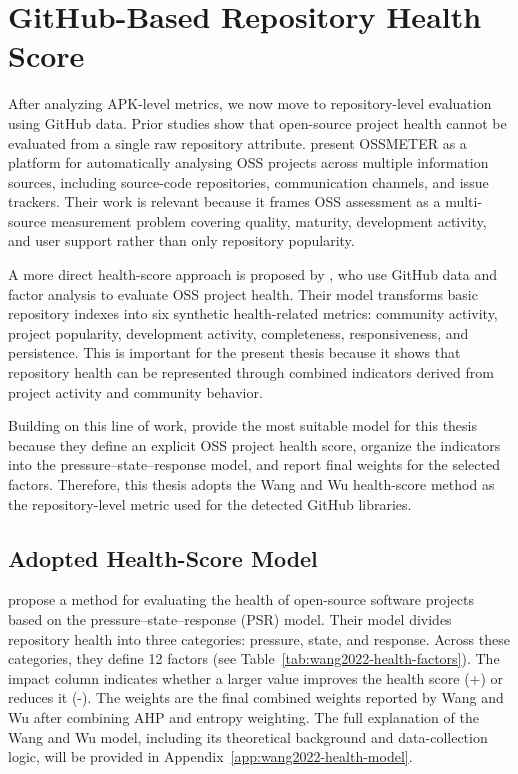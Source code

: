 \documentclass[12pt,a4paper]{report}
\begin{document}
\section{GitHub-Based Repository Health Score}

After analyzing APK-level metrics, we now move to repository-level evaluation using GitHub data. Prior studies show that open-source project health cannot be evaluated from a single raw repository attribute. \textcite{diruscioOSSMETERSoftwareMeasurement2015} present OSSMETER as a platform for automatically analysing OSS projects across multiple information sources, including source-code repositories, communication channels, and issue trackers. Their work is relevant because it frames OSS assessment as a multi-source measurement problem covering quality, maturity, development activity, and user support rather than only repository popularity.

A more direct health-score approach is proposed by \parencite{jiangMetricsEvaluateHealth2019}, who use GitHub data and factor analysis to evaluate OSS project health. Their model transforms basic repository indexes into six synthetic health-related metrics: community activity, project popularity, development activity, completeness, responsiveness, and persistence. This is important for the present thesis because it shows that repository health can be represented through combined indicators derived from project activity and community behavior.

Building on this line of work, \parencite{wangMethodEvaluateHealth2022} provide the most suitable model for this thesis because they define an explicit OSS project health score, organize the indicators into the pressure--state--response model, and report final weights for the selected factors. Therefore, this thesis adopts the Wang and Wu health-score method as the repository-level metric used for the detected GitHub libraries.

\subsection{Adopted Health-Score Model}

\textcite{wangMethodEvaluateHealth2022} propose a method for evaluating the health of open-source software projects based on the pressure--state--response (PSR) model. Their model divides repository health into three categories: pressure, state, and response. Across these categories, they define 12 factors (see Table~\ref{tab:wang2022-health-factors}). The impact column indicates whether a larger value improves the health score (+) or reduces it (-). The weights are the final combined weights reported by Wang and Wu after combining AHP and entropy weighting. The full explanation of the Wang and Wu model, including its theoretical background and data-collection logic, will be provided in Appendix~\ref{app:wang2022-health-model}.
\end{document}
